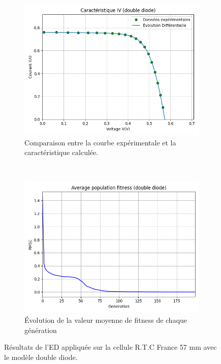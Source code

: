 \begin{figure}
    \centering
    \begin{subfigure}[b]{0.45\textwidth}
        \includegraphics[width=\textwidth]{resources/RTCFrance/doubled/iv.png}
        \caption{Comparaison entre la courbe expérimentale et la caractéristique calculée.}
    \end{subfigure}
    ~
    \begin{subfigure}[b]{0.45\textwidth}
        \includegraphics[width=\textwidth]{resources/RTCFrance/doubled/fitness.png}
        \caption{Évolution de la valeur moyenne de fitness de chaque génération}
    \end{subfigure}
    \caption{Résultats de l'ED appliquée sur la cellule R.T.C France 57 mm avec le modèle double diode.}
    \label{fig:RTCdoublecarac}
\end{figure}

